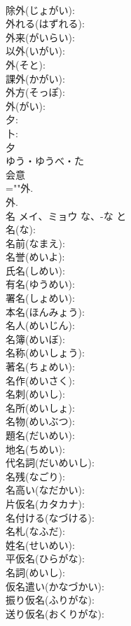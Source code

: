 \documentclass[8pt]{extreport}
\begin{document}
\begin{CJK}{UTF8}{min}
\\	除外(じょがい): 
\\	外れる(はずれる): 
\\	外来(がいらい): 
\\	以外(いがい): 
\\	外(そと): 
\\	課外(かがい): 
\\	外方(そっぽ): 
\\	外(がい): 
\\	夕: 
\\	卜: 
\\	夕	
\\	ゆう・ゆうべ・た	
\\	会意 
\\	=""外.
\\	外.
\\	名	メイ、ミョウ	な、-な	と	
\\	名(な): 
\\	名前(なまえ): 
\\	名誉(めいよ): 
\\	氏名(しめい): 
\\	有名(ゆうめい): 
\\	署名(しょめい): 
\\	本名(ほんみょう): 
\\	名人(めいじん): 
\\	名簿(めいぼ): 
\\	名称(めいしょう): 
\\	著名(ちょめい): 
\\	名作(めいさく): 
\\	名刺(めいし): 
\\	名所(めいしょ): 
\\	名物(めいぶつ): 
\\	題名(だいめい): 
\\	地名(ちめい): 
\\	代名詞(だいめいし): 
\\	名残(なごり): 
\\	名高い(なだかい): 
\\	片仮名(カタカナ): 
\\	名付ける(なづける): 
\\	名札(なふだ): 
\\	姓名(せいめい): 
\\	平仮名(ひらがな): 
\\	名詞(めいし): 
\\	仮名遣い(かなづかい): 
\\	振り仮名(ふりがな): 
\\	送り仮名(おくりがな): 

\end{CJK}
\end{document}
